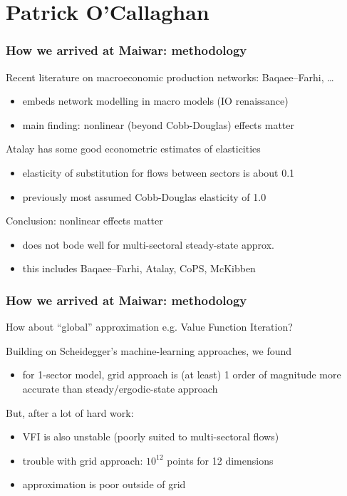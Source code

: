 \documentclass[handout,english]{beamer}
\begin{document}
\section{Patrick O'Callaghan}
\begin{frame}
  \frametitle{How we arrived at Maiwar: methodology}
  Recent literature on macroeconomic production networks: Baqaee--Farhi, \dots
  \begin{itemize}
    \item embeds network modelling in macro models (IO renaissance)
    \item main finding: nonlinear (beyond Cobb-Douglas) effects matter
  \end{itemize}
  Atalay has some good econometric estimates of elasticities
  \begin{itemize}
    \item elasticity of substitution for flows between sectors is about 0.1
    \item previously most assumed Cobb-Douglas elasticity of 1.0
  \end{itemize}
  Conclusion: nonlinear effects matter
  \begin{itemize}
    \item {\color{patrickcolor3}
      does not bode well for multi-sectoral steady-state approx.}
    \item this includes Baqaee--Farhi, Atalay, CoPS, McKibben
  \end{itemize}
\end{frame}
\begin{frame}
  \frametitle{How we arrived at Maiwar: methodology}
  How about ``global'' approximation e.g. Value Function Iteration?

  Building on Scheidegger's machine-learning approaches, we found
  \begin{itemize}
    \item for 1-sector model, grid approach is (at least) 1 order of magnitude 
      more accurate than steady/ergodic-state approach
  \end{itemize}
  But, after a lot of hard work:
  \begin{itemize}
    \item VFI is also unstable (poorly suited to multi-sectoral flows)
    \item trouble with grid approach: $10 ^ {12}$ points for 12 dimensions
    \item approximation is poor outside of grid
  \end{itemize}
\end{frame}
\end{document}
